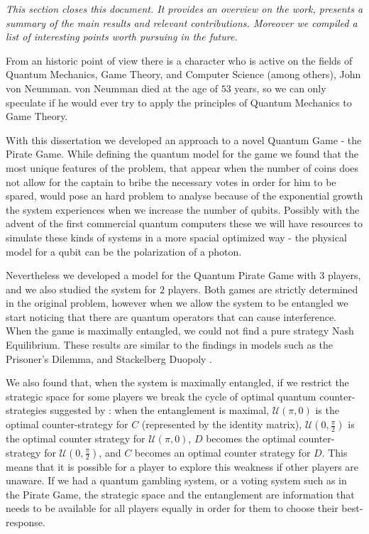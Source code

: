 \label{cap:conclusions}

\textit{This section closes this document. It provides an overview on the work, presents a summary of the main results and relevant contributions. Moreover we compiled a list of interesting points worth pursuing in the future.}

From an historic point of view there is a character who is active on the fields of Quantum Mechanics, Game Theory, and Computer Science (among others), John von Neumman. von Neumman died at the age of $53$ years, so we can only speculate if he would ever try to apply the principles of Quantum Mechanics to Game Theory. 




With this dissertation we developed an approach to a novel Quantum Game - the Pirate Game. While defining the quantum model for the game we found that the most unique features of the problem, that appear when the number of coins does not allow for the captain to bribe the necessary votes in order for him to be spared, would pose an hard problem to analyse because of the exponential growth the system experiences when we increase the number of qubits. Possibly with the advent of the first commercial quantum computers these we will have resources to simulate these kinds of systems in a more spacial optimized way - the physical model for a qubit can be the polarization of a photon. 

Nevertheless we developed a model for the Quantum Pirate Game with $3$ players, and we also studied the system for $2$ players. Both games are strictly determined in the original problem, however when we allow the system to be entangled we start noticing that  there are quantum operators that can cause interference. When the game is maximally entangled, we could not find a pure strategy Nash Equilibrium. These results are similar to the findings in models such as the Prisoner's Dilemma\cite{Eisert2008}\cite{Letters2002}, and Stackelberg Duopoly \cite{Khan2011}.

We also found that, when the system is maximally entangled, if we restrict the strategic space for some players we break the cycle of optimal quantum counter-strategies suggested by \cite{Du}: when the entanglement is maximal, $\mathcal{U}(\pi, 0)$ is the optimal counter-strategy for $C$ (represented by the identity matrix), $\mathcal{U}(0, \frac{\pi}{2})$ is the optimal counter strategy for $\mathcal{U}(\pi, 0)$, $D$ becomes the optimal counter-strategy for $\mathcal{U}(0, \frac{\pi}{2})$, and $C$ becomes an optimal counter strategy for $D$. This means that it is possible for a player to explore this weakness if other players are unaware. If we had a quantum gambling system, or a voting system such as in the Pirate Game, the strategic space and the entanglement are information that needs to be available for all players equally in order for them to choose their best-response.

